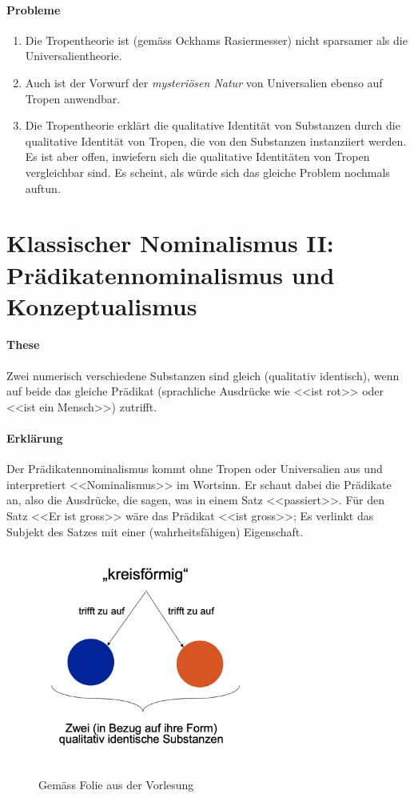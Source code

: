 \documentclass[../main.tex]{subfiles}
\begin{document}
\paragraph{Probleme}
\begin{enumerate}
	\item Die Tropentheorie ist (gemäss Ockhams Rasiermesser) nicht sparsamer als die Universalientheorie.
	\item Auch ist der Vorwurf der \textit{mysteriösen Natur} von Universalien ebenso auf Tropen anwendbar. 
	\item Die Tropentheorie erklärt die qualitative Identität von Substanzen durch die qualitative Identität von Tropen, die von den Substanzen instanziiert werden. Es ist aber offen, inwiefern sich die qualitative Identitäten von Tropen vergleichbar sind. Es scheint, als würde sich das gleiche Problem nochmals auftun. 
\end{enumerate}

\section{Klassischer Nominalismus II: Prädikatennominalismus und Konzeptualismus}
\paragraph{These} Zwei numerisch verschiedene Substanzen sind gleich (qualitativ identisch), wenn auf beide das gleiche Prädikat (sprachliche Ausdrücke wie <<ist rot>> oder <<ist ein Mensch>>) zutrifft.
\paragraph{Erklärung} Der Prädikatennominalismus kommt ohne Tropen oder Universalien aus und interpretiert <<Nominalismus>> im Wortsinn. Er schaut dabei die Prädikate an, also die Ausdrücke, die sagen, was in einem Satz <<passiert>>. Für den Satz <<Er ist gross>> wäre das Prädikat <<ist gross>>; Es verlinkt das Subjekt des Satzes mit einer (wahrheitsfähigen) Eigenschaft. 

\vspace{10pt}
\begin{figure}[!htb]
\centering
{\centering\includegraphics[height=7cm]{images/praedikatennominalismus.png}\endcenter}
\caption{Gemäss Folie aus der Vorlesung}
\end{figure}
\end{document}
